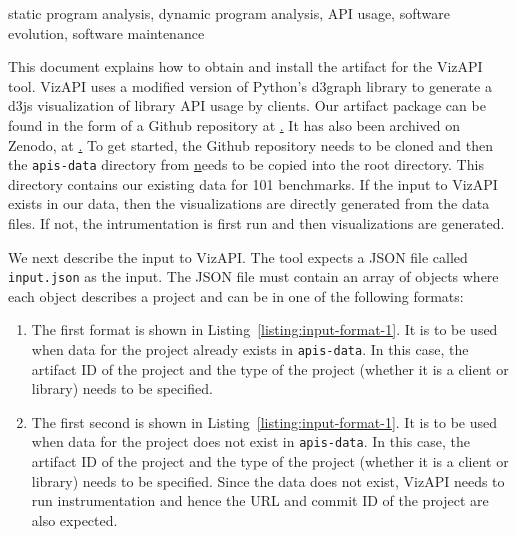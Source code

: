 \documentclass[conference]{IEEEtran}
\begin{document}
\begin{IEEEkeywords}
static program analysis,
dynamic program analysis,
API usage,
software evolution,
software maintenance
\end{IEEEkeywords}


This document explains how to obtain and install the artifact for the VizAPI tool. VizAPI uses a modified version of Python's d3graph library to generate a d3js visualization of library API usage by clients. Our artifact package can be found in the form of a Github repository at \href{https://github.com/SruthiVenkat/api-visualization-tool}. It has also been archived on Zenodo, at \href{https://zenodo.org/record/7023911}. To get started, the Github repository needs to be cloned and then the \texttt{apis-data} directory from \href{https://doi.org/10.5281/zenodo.7023872} needs to be copied into the root directory. This directory contains our existing data for 101 benchmarks. If the input to VizAPI exists in our data, then the visualizations are directly generated from the data files. If not, the intrumentation is first run and then visualizations are generated.

We next describe the input to VizAPI. The tool expects a JSON file called \texttt{input.json} as the input. The JSON file must contain an array of objects where each object describes a project and can be in one of the following formats:

\begin{enumerate}
\item The first format is shown in Listing~\ref{listing:input-format-1}. It is to be used when data for the project already exists in \texttt{apis-data}. In this case, the artifact ID of the project and the type of the project (whether it is a client or library) needs to be specified.

\item The first second is shown in Listing~\ref{listing:input-format-1}. It is to be used when data for the project does not exist in \texttt{apis-data}. In this case, the artifact ID of the project and the type of the project (whether it is a client or library) needs to be specified. Since the data does not exist, VizAPI needs to run instrumentation and hence the URL and commit ID of the project are also expected.

\end{enumerate}
\end{document}
